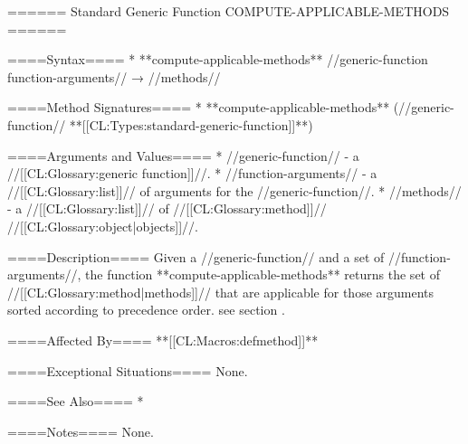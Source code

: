 ====== Standard Generic Function COMPUTE-APPLICABLE-METHODS ======

====Syntax====
  * **compute-applicable-methods** //generic-function function-arguments// → //methods//

====Method Signatures====
  * **compute-applicable-methods** (//generic-function// **[[CL:Types:standard-generic-function]]**)

====Arguments and Values====
  * //generic-function// - a //[[CL:Glossary:generic function]]//.
  * //function-arguments// - a //[[CL:Glossary:list]]// of arguments for the //generic-function//.
  * //methods// - a //[[CL:Glossary:list]]// of //[[CL:Glossary:method]]// //[[CL:Glossary:object|objects]]//.

====Description====
Given a //generic-function// and a set of //function-arguments//, the function **compute-applicable-methods** returns the set of //[[CL:Glossary:method|methods]]// that are applicable for those arguments sorted according to precedence order. see section {\secref\MethodSelectionAndCombination}.

====Affected By====
**[[CL:Macros:defmethod]]**

====Exceptional Situations====
None.

====See Also====
  * {\secref\MethodSelectionAndCombination}

====Notes====
None.

